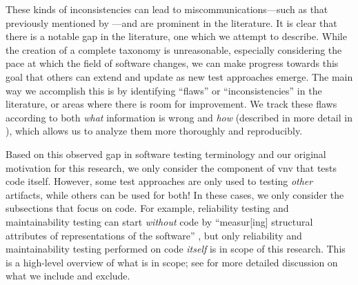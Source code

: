 These kinds of inconsistencies can lead to miscommunications---such as that
previously mentioned by \citet[p.~7]{KanerEtAl2011}---and are prominent in the
literature. \expBasedCatMain{} \tourFlaw{} \loadFlaw{} \alphaFlaw{}
It is clear that there is a notable gap in the literature, one which we
attempt to describe. While the creation of a complete taxonomy is
unreasonable, especially considering the pace at which the field of software
changes, we can make progress towards this goal that others can extend and
update as new test approaches emerge. The main way we accomplish this is by
identifying ``flaws'' or ``inconsistencies'' in the literature, or areas where
there is room for improvement. We track these flaws according to both
\emph{what} information is wrong and \emph{how} (described in more
detail in ), which allows us to analyze them more thoroughly
and reproducibly.

\label{scope-overview}
Based on this observed gap in software testing terminology and our original
motivation for this research, we only consider the component of \acf{vnv} that
tests code itself. However, some test approaches are only
used to testing \emph{other} artifacts, while others can be used for both! In
these cases, we only consider the subsections that focus on code. For example,
reliability testing and maintainability testing can start \emph{without} code
by ``measur[ing] structural attributes of representations of the software''
\citep[p.~18]{FentonAndPfleeger1997}, but only reliability and
maintainability testing performed on code \emph{itself} is in scope of this
research. \ifnotpaper This is a high-level overview of what is in scope; see
     for more detailed discussion on what we include and exclude.
\fi

